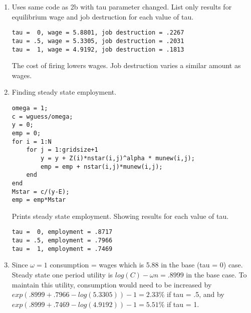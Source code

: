 \documentclass[12pt]{article}
\begin{document}
\begin{onehalfspace}
\begin{enumerate}[1.]
    
    \item Uses same code as 2b with tau parameter changed. List only results for equilibrium wage and job destruction for each value of tau.
\begin{lstlisting}
tau =  0, wage = 5.8801, job destruction = .2267
tau = .5, wage = 5.3305, job destruction = .2031
tau =  1, wage = 4.9192, job destruction = .1813
\end{lstlisting}
 
The cost of firing lowers wages. Job destruction varies a similar amount as wages.
    \item
    Finding steady state employment.
\begin{lstlisting}
omega = 1;
c = wguess/omega;
y = 0;
emp = 0;
for i = 1:N
    for j = 1:gridsize+1
        y = y + Z(i)*nstar(i,j)^alpha * munew(i,j);
        emp = emp + nstar(i,j)*munew(i,j);
    end
end
Mstar = c/(y-E);
emp = emp*Mstar
\end{lstlisting}
Prints steady state employment. Showing results for each value of tau.
\begin{lstlisting}
tau =  0, employment = .8717
tau = .5, employment = .7966
tau =  1, employment = .7469
\end{lstlisting}
    \item
    Since $\omega=1$ consumption = wages which is 5.88 in the base (tau = 0) case. Steady state one period utility is $log(C) - \omega n = .8999$  in the base case. To maintain this utility, consumption would need to be increased by $exp\left(.8999+.7966 - log(5.3305)\right)-1 = 2.33\%$ if tau = .5, and by $exp\left(.8999+.7469 - log(4.9192)\right)-1 = 5.51\%$ if tau = 1.
\end{enumerate}

\end{onehalfspace}
\end{document}
